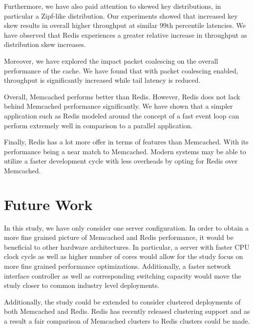 Furthermore, we have also paid attention to skewed key distributions, in particular a Zipf-like distribution. Our experiments showed that increased key skew results in overall higher throughput at similar 99th percentile latencies. We have observed that Redis experiences a greater relative increase in throughput as distribution skew increases.

Moreover, we have explored the impact packet coalescing on the overall performance of the cache. We have found that with packet coalescing enabled, throughput is significantly increased while tail latency is reduced.

Overall, Memcached performs better than Redis. However, Redis does not lack behind Memcached performance significantly. We have shown that a simpler application such as Redis modeled around the concept of a fast event loop can perform extremely well in comparison to a parallel application.

Finally, Redis has a lot more offer in terms of features than Memcached. With its performance being a near match to Memcached. Modern systems may be able to utilize a faster development cycle with less overheads by opting for Redis over Memcached.

\section{Future Work}
In this study, we have only consider one server configuration. In order to obtain a more fine grained picture of Memcached and Redis performance, it would be beneficial to other hardware architectures. In particular, a server with faster CPU clock cycle as well as higher number of cores would allow for the study focus on more fine grained performance optimizations. Additionally, a faster network interface controller as well as corresponding switching capacity would move the study closer to common industry level deployments.

Additionally, the study could be extended to consider clustered deployments of both Memcached and Redis. Redis has recently released clustering support and as a result a fair comparison of Memcached clusters to Redis clusters could be made.

